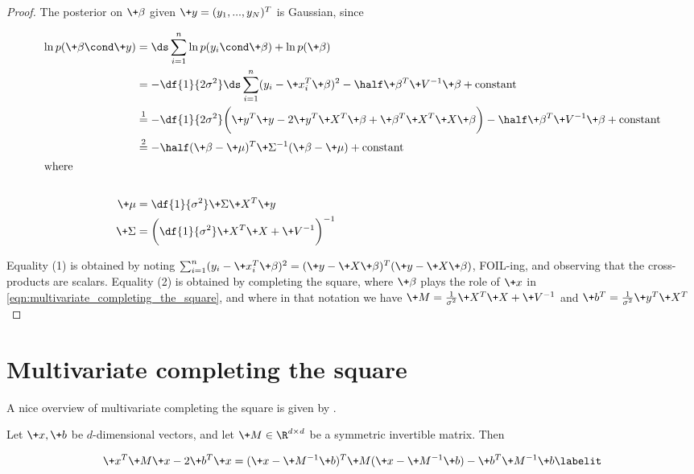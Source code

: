 \documentclass{article} %
\begin{document}
\begin{proof}
The posterior on $\+\beta$ given $\+y = (y_1,...,y_N)^T$ is Gaussian,  since

\begin{align*}
\ln p(\+\beta \cond \+y) &= \ds\sum_{i=1}^n \ln p(y_i \cond \+\beta)  + \ln p(\+\beta) \\
&= -\df{1}{2 \sigma^2} \ds\sum_{i=1}^n (y_i - \+x_i^T \+\beta)^2  - \half \+\beta^T \+V^{-1} \+\beta + \text{constant} \\
&\stackrel{1}{=} -\df{1}{2 \sigma^2} \bigg(  \+y^T \+y - 2 \+y^T \+X^T \+\beta + \+\beta^T \+X^T \+X \+\beta \bigg)  - \half \+\beta^T \+V^{-1} \+\beta + \text{constant} \\
&\stackrel{2}{=} -\half (\+\beta - \+\mu)^T \+\Sigma^{-1} (\+\beta - \+\mu) +  \text{constant} \\
\intertext{where}  \\
\+\mu &= \df{1}{\sigma^2} \+\Sigma \+X^T \+y \\
\+\Sigma &= \bigg( \df{1}{\sigma^2}  \+X^T \+X + \+V^{-1}  \bigg)^{-1} \\
\end{align*}

Equality (1) is obtained by noting $ \sum_{i=1}^n (y_i - \+x_i^T \+\beta)^2  = (\+y - \+X \+\beta)^T (\+y - \+X \+\beta)$, FOIL-ing, and observing that the cross-products are scalars.   Equality (2) is obtained by completing the square,  where $\+\beta$ plays the role of $\+x$  in \eqref{eqn:multivariate_completing_the_square},  and where in that notation we have $\+M = \frac{1}{\sigma^2} \+X^T \+X + \+V^{-1}$ and $\+b^T = \frac{1}{\sigma^2} \+y^T \+X^T$
\end{proof}


\section{Multivariate completing the square}

A nice overview of multivariate completing the square is given by \cite{gundersenXXXXcompleting}.    

Let $\+x,  \+b$ be $d$-dimensional vectors, and let $\+M \in \R^{d \times d}$ be a symmetric invertible matrix. Then

\begin{align*}
\+x^T \+M \+x - 2 \+b^T \+x = (\+x - \+M^{-1} \+b)^T \+M (\+x - \+M^{-1} \+b) - \+b^T \+M^{-1} \+b
 \labelit \label{eqn:multivariate_completing_the_square}
\end{align*}



% 
{}

\end{document}
